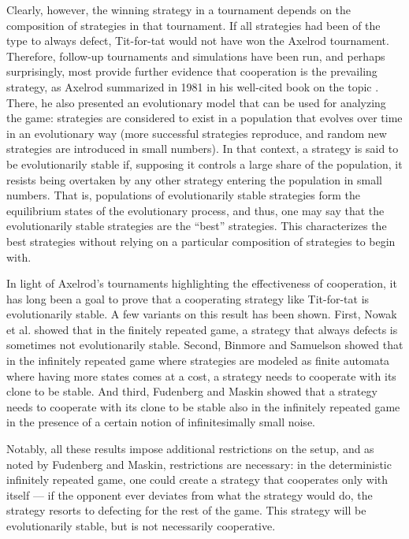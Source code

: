 \documentclass[12pt]{article}
\theoremstyle{definition}
\theoremstyle{remark}
\begin{document}
Clearly, however, the winning strategy in a tournament depends on the composition of strategies in that tournament. If all strategies had been of the type to always defect, Tit-for-tat would not have won the Axelrod tournament. Therefore, follow-up tournaments and simulations have been run, and perhaps surprisingly, most provide further evidence that cooperation is the prevailing strategy, as Axelrod summarized in 1981 in his well-cited book on the topic  \cite{axelrod1981evolution}. There, he also presented an evolutionary model that can be used for analyzing the game: strategies are considered to exist in a population that evolves over time in an evolutionary way (more successful strategies reproduce, and random new strategies are introduced in small numbers). In that context, a strategy is said to be evolutionarily stable if, supposing it controls a large share of the population, it resists being overtaken by any other strategy entering the population in small numbers. That is, populations of evolutionarily stable strategies form the equilibrium states of the evolutionary process, and thus, one may say that the evolutionarily stable strategies are the ``best'' strategies. This characterizes the best strategies without relying on a particular composition of strategies to begin with.

In light of Axelrod's tournaments highlighting the effectiveness of cooperation, it has long been a goal to prove that a cooperating strategy like Tit-for-tat is evolutionarily stable. A few variants on this result has been shown. First, Nowak et al. \cite{nowak2004emergence} showed that in the finitely repeated game, a strategy that always defects is sometimes not evolutionarily stable. Second, Binmore and Samuelson \cite{binmore1992evolutionary} showed that in the infinitely repeated game where strategies are modeled as finite automata where having more states comes at a cost, a strategy needs to cooperate with its clone to be stable. And third, Fudenberg and Maskin \cite{fundenberg1990evolution} showed that a strategy needs to cooperate with its clone to be stable also in the infinitely repeated game in the presence of a certain notion of infinitesimally small noise.

Notably, all these results impose additional restrictions on the setup, and as noted by Fudenberg and Maskin, restrictions are necessary: in the deterministic infinitely repeated game, one could create a strategy that cooperates only with itself — if the opponent ever deviates from what the strategy would do, the strategy resorts to defecting for the rest of the game. This strategy will be evolutionarily stable, but is not necessarily cooperative. 
\end{document}
